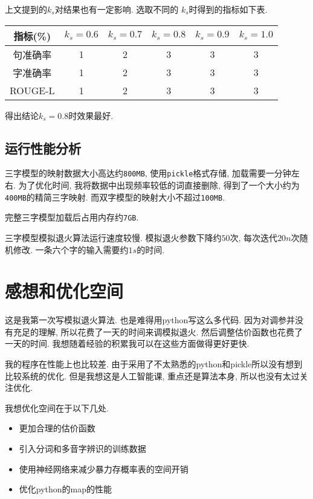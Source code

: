 上文提到的$k_s$对结果也有一定影响. 选取不同的 $k_s$时得到的指标如下表.

\begin{tabular}{|c|ccccc|}
	\hline
	指标(\%) & $k_s=0.6$ & $k_s=0.7$ & $k_s=0.8$ & $k_s=0.9$ & $k_s=1.0$ \tabularnewline \hline
	句准确率 & 1 & 2 & 3 & 3 & 3 \tabularnewline
	字准确率 & 1 & 2 & 3 & 3 & 3 \tabularnewline
	ROUGE-L  & 1 & 2 & 3 & 3 & 3 \tabularnewline \hline
\end{tabular}

得出结论$k_s=0.8$时效果最好.

\subsection{运行性能分析}
三字模型的映射数据大小高达约\texttt{800MB}, 使用\texttt{pickle}格式存储, 加载需要一分钟左右. 为了优化时间, 我将数据中出现频率较低的词直接删除, 得到了一个大小约为\texttt{400MB}的精简三字映射. 而双字模型的映射大小不超过\texttt{100MB}.

完整三字模型加载后占用内存约\texttt{7GB}.

三字模型模拟退火算法运行速度较慢. 模拟退火参数下降约$50$次, 每次迭代$20n$次随机修改. 一条六个字的输入需要约$1s$的时间.

\section{感想和优化空间}
这是我第一次写模拟退火算法. 也是难得用python写这么多代码. 因为对调参并没有充足的理解, 所以花费了一天的时间来调模拟退火. 然后调整估价函数也花费了一天的时间. 我想随着经验的积累我可以在这些方面做得更好更快.

我的程序在性能上也比较差. 由于采用了不太熟悉的python和pickle所以没有想到比较系统的优化. 但是我想这是人工智能课, 重点还是算法本身, 所以也没有太过关注优化.

我想优化空间在于以下几处.

\begin{itemize}
	\item 更加合理的估价函数
	\item 引入分词和多音字辨识的训练数据
	\item 使用神经网络来减少暴力存概率表的空间开销
	\item 优化python的map的性能
\end{itemize}
